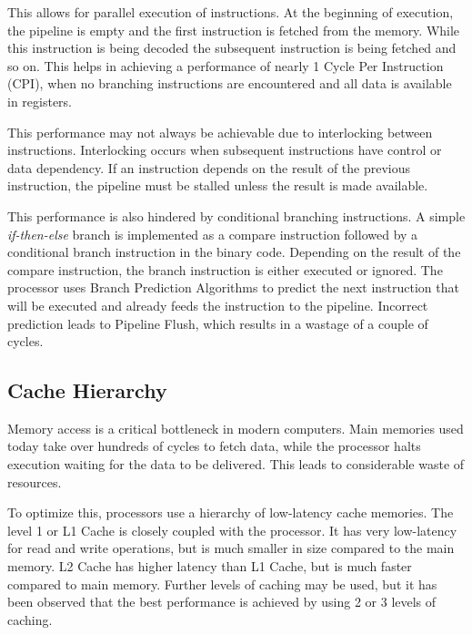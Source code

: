 This allows for parallel execution of instructions. At the beginning of execution, the pipeline is empty and the first instruction is fetched from the memory. While this instruction is being decoded the subsequent instruction is being fetched and so on. This helps in achieving a performance of nearly 1 Cycle Per Instruction (CPI), when no branching instructions are encountered and all data is available in registers.

This performance may not always be achievable due to interlocking between instructions. Interlocking occurs when subsequent instructions have control or data dependency. If an instruction depends on the result of the previous instruction, the pipeline must be stalled unless the result is made available.

This performance is also hindered by conditional branching instructions. A simple \textit{if-then-else} branch is implemented as a compare instruction followed by a conditional branch instruction in the binary code. Depending on the result of the compare instruction, the branch instruction is either executed or ignored. The processor uses Branch Prediction Algorithms to predict the next instruction that will be executed and already feeds the instruction to the pipeline. Incorrect prediction leads to Pipeline Flush, which results in a wastage of a couple of cycles.

\subsection{Cache Hierarchy}
Memory access is a critical bottleneck in modern computers. Main memories used today take over hundreds of cycles to fetch data, while the processor halts execution waiting for the data to be delivered. This leads to considerable waste of resources.

To optimize this, processors use a hierarchy of low-latency cache memories. The level 1 or L1 Cache is closely coupled with the processor. It has very low-latency for read and write operations, but is much smaller in size compared to the main memory. L2 Cache has higher latency than L1 Cache, but is much faster compared to main memory. Further levels of caching may be used, but it has been observed that the best performance is achieved by using 2 or 3 levels of caching.


